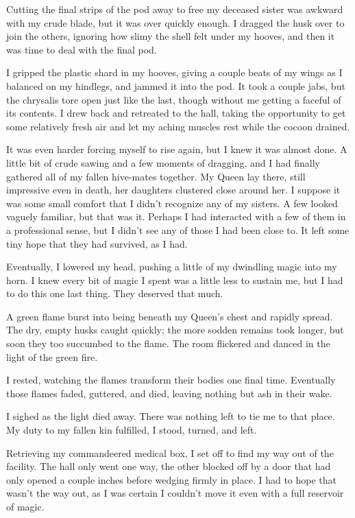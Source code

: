 Cutting the final strips of the pod away to free my deceased sister was awkward with my crude blade, but it was over quickly enough. I dragged the husk over to join the others, ignoring how slimy the shell felt under my hooves, and then it was time to deal with the final pod.

I gripped the plastic shard in my hooves, giving a couple beats of my wings as I balanced on my hindlegs, and jammed it into the pod. It took a couple jabs, but the chrysalis tore open just like the last, though without me getting a faceful of its contents. I drew back and retreated to the hall, taking the opportunity to get some relatively fresh air and let my aching muscles rest while the cocoon drained.

It was even harder forcing myself to rise again, but I knew it was almost done. A little bit of crude sawing and a few moments of dragging, and I had finally gathered all of my fallen hive-mates together. My Queen lay there, still impressive even in death, her daughters clustered close around her. I suppose it was some small comfort that I didn’t recognize any of my sisters. A few looked vaguely familiar, but that was it. Perhaps I had interacted with a few of them in a professional sense, but I didn’t see any of those I had been close to. It left some tiny hope that they had survived, as I had.

Eventually, I lowered my head, pushing a little of my dwindling magic into my horn. I knew every bit of magic I spent was a little less to sustain me, but I had to do this one last thing. They deserved that much.

A green flame burst into being beneath my Queen’s chest and rapidly spread. The dry, empty husks caught quickly; the more sodden remains took longer, but soon they too succumbed to the flame. The room flickered and danced in the light of the green fire.

I rested, watching the flames transform their bodies one final time. Eventually those flames faded, guttered, and died, leaving nothing but ash in their wake.

I sighed as the light died away. There was nothing left to tie me to that place. My duty to my fallen kin fulfilled, I stood, turned, and left.

Retrieving my commandeered medical box, I set off to find my way out of the facility. The hall only went one way, the other blocked off by a door that had only opened a couple inches before wedging firmly in place. I had to hope that wasn’t the way out, as I was certain I couldn’t move it even with a full reservoir of magic.

